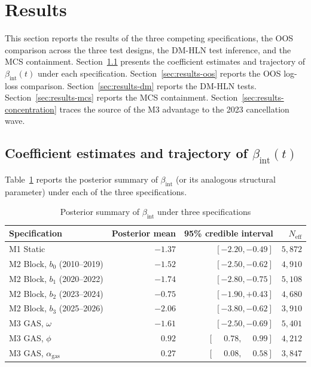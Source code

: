 \documentclass[12pt,a4paper]{article}
\newcommand{\bint}{\beta_{\text{int}}}
\theoremstyle{plain}
\theoremstyle{definition}
\begin{document}
\section{Results}
\label{sec:results}

This section reports the results of the three competing specifications, the OOS comparison across the three test designs, the DM-HLN test inference, and the MCS containment. Section~\ref{sec:results-coef} presents the coefficient estimates and trajectory of $\bint(t)$ under each specification. Section~\ref{sec:results-oos} reports the OOS log-loss comparison. Section~\ref{sec:results-dm} reports the DM-HLN tests. Section~\ref{sec:results-mcs} reports the MCS containment. Section~\ref{sec:results-concentration} traces the source of the M3 advantage to the 2023 cancellation wave.

\subsection{Coefficient estimates and trajectory of $\bint(t)$}
\label{sec:results-coef}

Table~\ref{tab:results-coef} reports the posterior summary of $\bint$ (or its analogous structural parameter) under each of the three specifications.

\begin{table}[!htbp]
\centering
\caption{Posterior summary of $\bint$ under three specifications}
\label{tab:results-coef}
\begin{tabular}{lrrr}
\toprule
Specification & Posterior mean & 95\% credible interval & $N_{\text{eff}}$ \\
\midrule
M1 Static & $-1.37$ & $[-2.20, -0.49]$ & $5{,}872$ \\
M2 Block, $b_0$ (2010--2019) & $-1.52$ & $[-2.50, -0.62]$ & $4{,}910$ \\
M2 Block, $b_1$ (2020--2022) & $-1.74$ & $[-2.80, -0.75]$ & $5{,}108$ \\
M2 Block, $b_2$ (2023--2024) & $-0.75$ & $[-1.90, +0.43]$ & $4{,}680$ \\
M2 Block, $b_3$ (2025--2026) & $-2.06$ & $[-3.80, -0.62]$ & $3{,}910$ \\
M3 GAS, $\omega$ & $-1.61$ & $[-2.50, -0.69]$ & $5{,}401$ \\
M3 GAS, $\phi$ & $\phantom{-}0.92$ & $[\phantom{-}0.78, \phantom{-}0.99]$ & $4{,}212$ \\
M3 GAS, $\alpha_{\mathrm{gas}}$ & $\phantom{-}0.27$ & $[\phantom{-}0.08, \phantom{-}0.58]$ & $3{,}847$ \\
\bottomrule
\end{tabular}
\end{table}
\end{document}
